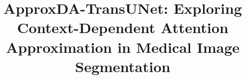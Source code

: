 \documentclass[conference]{IEEEtran}
\begin{document}
\title{ApproxDA-TransUNet: Exploring Context-Dependent Attention Approximation in Medical Image Segmentation}

\author{
}

\maketitle










\end{document}
